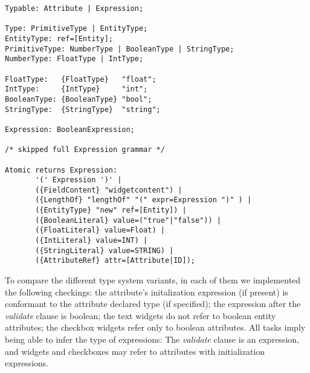 \begin{lstlisting}[language=xtext,float,label=lst:grammar-plain-types-and-ex,caption=Types
and Expressions.] 
Typable: Attribute | Expression;

Type: PrimitiveType | EntityType;
EntityType: ref=[Entity];
PrimitiveType: NumberType | BooleanType | StringType;
NumberType: FloatType | IntType;

FloatType:   {FloatType}   "float";
IntType:     {IntType}     "int";
BooleanType: {BooleanType} "bool";
StringType:	 {StringType}  "string";

Expression: BooleanExpression;

/* skipped full Expression grammar */

Atomic returns Expression:
       '(' Expression ')' |
       ({FieldContent} "widgetcontent") |
       ({LengthOf} "lengthOf" "(" expr=Expression ")" ) |
       ({EntityType} "new" ref=[Entity]) | 
       ({BooleanLiteral} value=("true"|"false")) |
       ({FloatLiteral} value=Float) |
       ({IntLiteral} value=INT) |
       ({StringLiteral} value=STRING) |
       ({AttributeRef} attr=[Attribute|ID]);
\end{lstlisting}

%




To compare the different type system variants, in each of them we implemented
the following checkings: the attribute's initalization expression (if present)
is conformant to the attribute declared type (if specified); the expression
after the \emph{validate} clause is boolean; the text widgets do not refer to
boolean entity attributes; the checkbox widgets refer only to boolean
attributes.
All tasks imply being able to infer the type of expressions: The \emph{validate}
clause is an expression, and widgets and checkboxes may refer to attributes with
initialization expressions.

